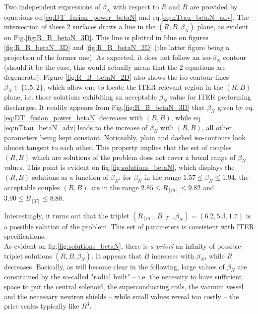 Two independent expressions of $\beta_N$ with respect to $R$ and $B$ are provided by equations eq.\ref{eq:DT_fusion_power_betaN} and eq.\ref{eq:nTtau_betaN_adv}. The intersection of these 2 surfaces draws a line in the $(R,B,\beta_N)$ plane, as evident on Fig.\ref{fig:R_B_betaN_3D}. This line is plotted in blue on figures \ref{fig:R_B_betaN_3D} and \ref{fig:R_B_betaN_2D} (the latter figure being a projection of the former one). As expected, it does not follow an iso-$\beta_N$ contour (should it be the case, this would actually mean that the 2 equations are degenerate). Figure \ref{fig:R_B_betaN_2D} also shows the iso-contour lines $\beta_N \in \{1.5, 2\}$, which allow one to locate the ITER relevant region in the $(R,B)$ plane, i.e. those solutions exhibiting an acceptable $\beta_N$ value for ITER performing discharges. 
It readily appears from Fig.\ref{fig:R_B_betaN_3D} that $\beta_N$ given by eq.\ref{eq:DT_fusion_power_betaN} decreases with $(R,B)$, while eq.\ref{eq:nTtau_betaN_adv} leads to the increase of $\beta_N$ with $(R,B)$, all other parameters being kept constant.
Noticeably, plain and dashed iso-contours look almost tangent to each other. This property implies that the set of couples $(R,B)$ which are solutions of the problem does not cover a broad range of $\beta_N$ values. This point is evident on fig.\ref{fig:solutions_betaN}, which displays the $(R,B)$ solutions as a function of $\beta_N$: for $\beta_N$ in the range $1.57 \leq \beta_N \leq 1.94$, the acceptable couples $(R,B)$ are in the range $2.85 \leq R_{[m]} \leq 9.82$ and $3.90 \leq B_{[T]} \leq 8.88$.

Interestingly, it turns out that the triplet $(R_{[m]},B_{[T]},\beta_N) = (6.2, 5.3, 1.7)$ is a possible solution of the problem. This set of parameters is consistent with ITER specifications. \\

As evident on fig.\ref{fig:solutions_betaN}, there is \emph{a priori} an infinity of possible triplet solutions $(R,B,\beta_N)$. It appears that $B$ increases with $\beta_N$, while $R$ decreases. Basically, as will become clear in the following, large values of  $\beta_N$ are constrained by the so-called "radial built" -- i.e. the necessity to have sufficient space to put the central solenoid, the superconducting coils, the vacuum vessel and the necessary neutron shields -- while small values reveal too costly -- the price scales typically like $R^3$.

